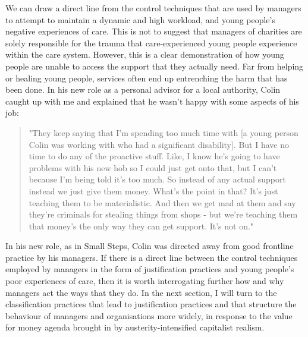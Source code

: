 We can draw a direct line from the control techniques that are used by managers to attempt to maintain a dynamic and high workload, and young people's negative experiences of care. This is not to suggest that managers of charities are solely responsible for the trauma that care-experienced young people experience within the care system. However, this is a clear demonstration of how young people are unable to access the support that they actually need. Far from helping or healing young people, services often end up entrenching the harm that has been done. In his new role as a personal advisor for a local authority, Colin caught up with me and explained that he wasn't happy with some aspects of his job:
\begin{quote}
"They keep saying that I'm spending too much time with [a young person Colin was working with who had a significant disability]. But I have no time to do any of the proactive stuff. Like, I know he's going to have problems with his new hob so I could just get onto that, but I can't because I'm being told it's too much. So instead of any actual support instead we just give them money. What's the point in that? It's just teaching them to be materialistic. And then we get mad at them and say they're criminals for stealing things from shops - but we're teaching them that money's the only way they can get support. It's not on."
\end{quote}
In his new role, as in Small Steps, Colin was directed away from good frontline practice by his managers. If there is a direct line between the control techniques employed by managers in the form of justification practices and young people's poor experiences of care, then it is worth interrogating further how and why managers act the ways that they do. In the next section, I will turn to the classification practices that lead to justification practices and that structure the behaviour of managers and organisations more widely, in response to the value for money agenda brought in by austerity-intensified capitalist realism.

